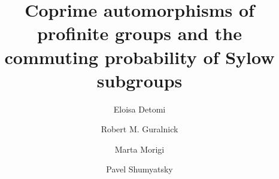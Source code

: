 \documentclass[12pt]{amsart}
\begin{document}
\title[Commuting probability]{Coprime automorphisms of profinite groups and the commuting probability of  Sylow subgroups}

\author[E. Detomi]{Eloisa Detomi}
\address{Dipartimento di Matematica \lq\lq Tullio Levi-Civita\rq\rq, Universit\`a degli Studi di Padova, Via Trieste 63, 35121 Padova, Italy} 
\author[R. M. Guralnick]{Robert M. Guralnick}
\address{ Department of Mathematics, University of
Southern California, Los Angeles, CA90089-2532, USA}
\author[M. Morigi]{Marta Morigi}
\address{Dipartimento di Matematica, Universit\`a di Bologna\\
Piazza di Porta San Donato 5 \\ 40126 Bologna \\ Italy}
\author[P. Shumyatsky]{Pavel Shumyatsky}
\address{Department of Mathematics, University of Brasilia\\
Brasilia-DF \\ 70910-900 Brazil}


 
 
\end{document}
